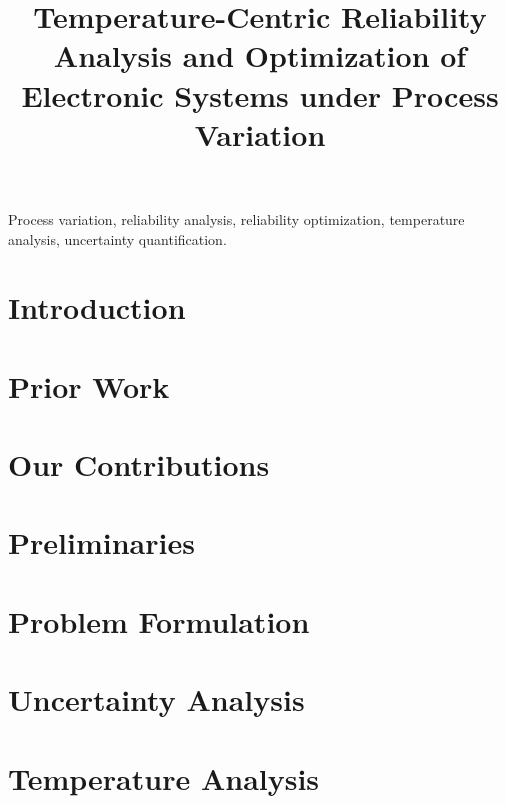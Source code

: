\documentclass[journal]{IEEEtran}
\title{{\fontsize{21}{26}\selectfont Temperature-Centric Reliability Analysis and Optimization of Electronic Systems under Process Variation}}
\author{\vspace{-1em}}
\begin{document}
  \maketitle

  \begin{abstract}
    
  \end{abstract}

  \begin{IEEEkeywords}
    Process variation,
    reliability analysis,
    reliability optimization,
    temperature analysis,
    uncertainty quantification.
  \end{IEEEkeywords}


  \section{Introduction} 
  

  \section{Prior Work} 
  

  \section{Our Contributions} 
  

  \section{Preliminaries} 
  

  \section{Problem Formulation} 
  

  \section{Uncertainty Analysis} 
  

  \section{Temperature Analysis} 
  
\end{document}
